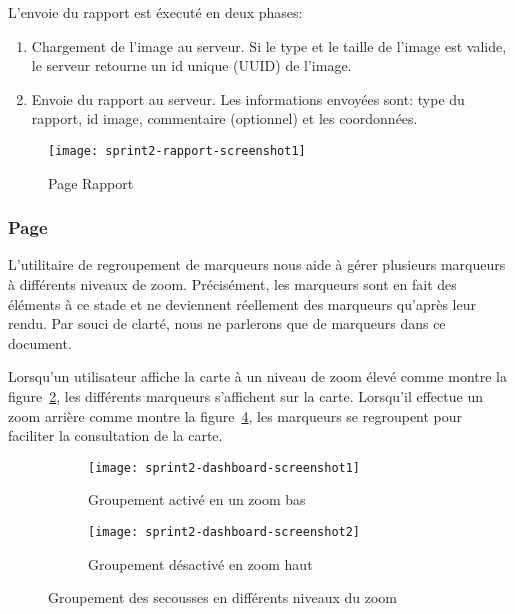 L'envoie du rapport est éxecuté en deux phases:

\begin{enumerate}
    \item Chargement de l'image au serveur. Si le type et le taille de l'image
        est valide, le serveur retourne un id unique (UUID) de l'image.
    \item Envoie du rapport au serveur. Les informations envoyées sont: type du
        rapport, id image, commentaire (optionnel) et les coordonnées.
\end{enumerate}

\begin{figure}[htbp]
    \centering
    \texttt{[image: sprint2-rapport-screenshot1]}
    \caption{Page Rapport}
\label{fig:sprint2-rapport-screenshot1}
\end{figure}

\subsubsection{Page }

L'utilitaire de regroupement de marqueurs nous aide à gérer plusieurs marqueurs
à différents niveaux de zoom. Précisément, les marqueurs sont en fait des
éléments à ce stade et ne deviennent réellement des marqueurs qu'après leur
rendu. Par souci de clarté, nous ne parlerons que de marqueurs dans ce
document.

Lorsqu'un utilisateur affiche la carte à un niveau de zoom élevé comme montre
la figure~\ref{fig:sprint2-dashboard-screenshot1}, les différents marqueurs
s'affichent sur la carte. Lorsqu'il effectue un zoom arrière comme montre la
figure~\ref{fig:sprint2-dashboard-screenshot2}, les marqueurs se regroupent
pour faciliter la consultation de la carte.

\begin{figure}[htbp]
    \begin{subfigure}{.5\textwidth}
        \centering
        \texttt{[image: sprint2-dashboard-screenshot1]}
        \caption{Groupement activé en un zoom bas}
\label{fig:sprint2-dashboard-screenshot1}
    \end{subfigure}
    \begin{subfigure}{.5\textwidth}
        \centering
        \texttt{[image: sprint2-dashboard-screenshot2]}
        \caption{Groupement désactivé en zoom haut}
\label{fig:sprint2-dashboard-screenshot2}
    \end{subfigure}
    \caption{Groupement des secousses en différents niveaux du zoom}
\end{figure}

